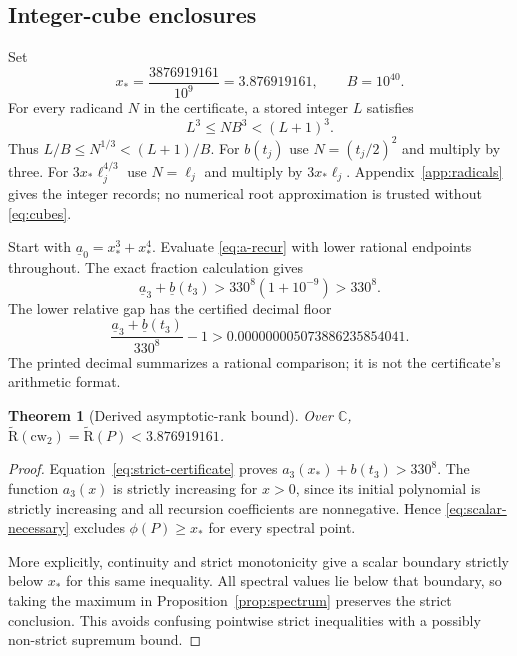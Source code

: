 \documentclass[11pt]{article}
\newtheorem{theorem}{Theorem}[section]
\theoremstyle{definition}\newtheorem{definition}[theorem]{Definition}
\theoremstyle{remark}\newtheorem{remark}[theorem]{Remark}
\newcommand{\AR}{\widetilde{\mathrm R}}
\newcommand{\C}{\mathbb C}
\begin{document}
\subsection{Integer-cube enclosures}

Set
\begin{equation}\label{eq:xstar}
 x_* = \frac{3876919161}{10^9}=3.876919161,
 \qquad B=10^{40}.
\end{equation}
For every radicand $N$ in the certificate, a stored integer $L$ satisfies
\begin{equation}\label{eq:cubes}
 L^3\leq NB^3<(L+1)^3.
\end{equation}
Thus $L/B\leq N^{1/3}<(L+1)/B$. For $b(t_j)$ use $N=(t_j/2)^2$ and multiply by three. For $3x_*\ell_j^{4/3}$ use $N=\ell_j$ and multiply by $3x_*\ell_j$. Appendix~\ref{app:radicals} gives the integer records; no numerical root approximation is trusted without \eqref{eq:cubes}.

Start with $\underline a_0=x_*^3+x_*^4$. Evaluate \eqref{eq:a-recur} with lower rational endpoints throughout. The exact fraction calculation gives
\begin{equation}\label{eq:strict-certificate}
 \underline a_3+\underline b(t_3)
 >330^8(1+10^{-9})>330^8.
\end{equation}
The lower relative gap has the certified decimal floor
\begin{equation}\label{eq:gap-decimal}
 \frac{\underline a_3+\underline b(t_3)}{330^8}-1
 >0.000000005073886235854041.
\end{equation}
The printed decimal summarizes a rational comparison; it is not the certificate's arithmetic format.

\begin{theorem}[Derived asymptotic-rank bound]\label{thm:bound}
Over $\C$, $\AR(\mathrm{cw}_2)=\AR(P)<3.876919161$.
\end{theorem}
\begin{proof}
Equation~\eqref{eq:strict-certificate} proves $a_3(x_*)+b(t_3)>330^8$. The function $a_3(x)$ is strictly increasing for $x>0$, since its initial polynomial is strictly increasing and all recursion coefficients are nonnegative. Hence \eqref{eq:scalar-necessary} excludes $\phi(P)\geq x_*$ for every spectral point.

More explicitly, continuity and strict monotonicity give a scalar boundary strictly below $x_*$ for this same inequality. All spectral values lie below that boundary, so taking the maximum in Proposition~\ref{prop:spectrum} preserves the strict conclusion. This avoids confusing pointwise strict inequalities with a possibly non-strict supremum bound.
\end{proof}
\end{document}
